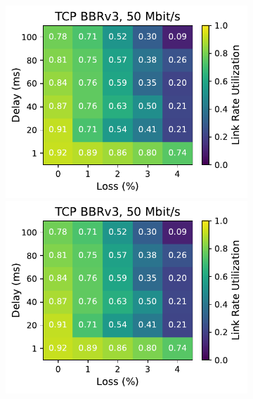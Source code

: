 \begin{figure}[ht]
\begin{subfigure}[b]{0.89cm}
        \includegraphics[width=\linewidth,trim={8cm 0 0 0},clip]{splitting-paper/figures/heatmaps/heatmap_tcp_bbr3_50mbps.pdf}
        \includegraphics[width=\linewidth,trim={8cm 0 0 0},clip]{splitting-paper/figures/heatmaps/heatmap_tcp_bbr3_50mbps.pdf}

\end{subfigure}
\end{figure}
